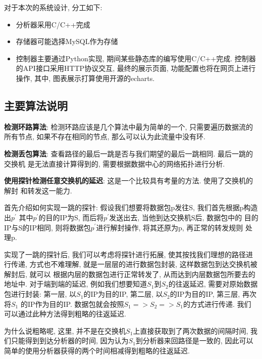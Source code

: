 {\begin{mdframed}[everyline=true]
对于本次的系统设计, 分工如下:
\begin{itemize}
    \setlength\itemsep{0.1em}
    \item 分析器采用C/C++完成
    \item 存储器可能选择MySQL作为存储
    \item 控制器主要通过Python实现, 期间某些静态库的编写使用C/C++完成.
            控制器的API接口采用HTTP协议交互, 最终的展示页面,
            功能配置也将在网页上进行操作, 其中, 图表展示打算使用开源的echarts.
\end{itemize}


\subsection{主要算法说明}

\textbf{检测环路算法}: 检测环路应该是几个算法中最为简单的一个,
只需要遍历数据流的所有节点, 如果不存在相同的节点,
那么可以认为此流量中没有环.

\textbf{检测丢包算法}: 查看路径的最后一跳是否与我们期望的最后一跳相同.
最后一跳的交换机 是无法直接计算得到的,
需要根据数据中心的网络拓扑进行分析.

\textbf{使用探针检测任意交换机的延迟}: 这是一个比较具有考量的方法.
使用了交换机的解封 和转发这一能力.

首先介绍如何实现一跳的探针: 假设我们想要将数据包p发往S,
我们首先根据p构造出\(p^{'}\) 其中\(p^{'}\)的目的IP为S,
而后将\(p^{'}\)发送出去, 当他到达交换机S后, 数据包中的
目的IP与S的IP相同, 则将数据包\(p^{'}\)进行解封操作, 将其还原为p,
再正常的转发规则 处理p.

实现了一跳的探针后, 我们可以考虑将探针进行拓展,
使其按找我们理想的路径进行传递, 方式也不难理解,
就是一层层的进行数据包封装, 这样数据包到达交换机被解封后, 就可以
根据内层的数据包进行正常转发了, 从而达到内层数据包所要去的地址中.
对于端到端的延迟, 例如我们想要知道\(S_{1}\)到\(S_{2}\)的往返延迟,
需要对原始数据包进行封装: 第一层, 以\(S_{1}\)的IP为目的IP, 第二层,
以\(S_{2}\)的IP为目的IP, 第三层, 再次将\(S_{1}\) 的IP作为目的IP.
数据包就会按照\(S_{1} => S_{2} => S_{1}\)的方式进行传递. 我们
可以通过此种方法得到粗略的往返延迟.

为什么说粗略呢, 这里,
并不是在交换机\(S_{1}\)上直接获取到了两次数据的间隔时间,
我们只能得到到达分析器的时间, 因为认为\(S_{1}\)到分析器来回路径是一致的,
因此可以 简单的使用分析器获得的两个时间相减得到粗略的往返延迟.



\end{mdframed}}
